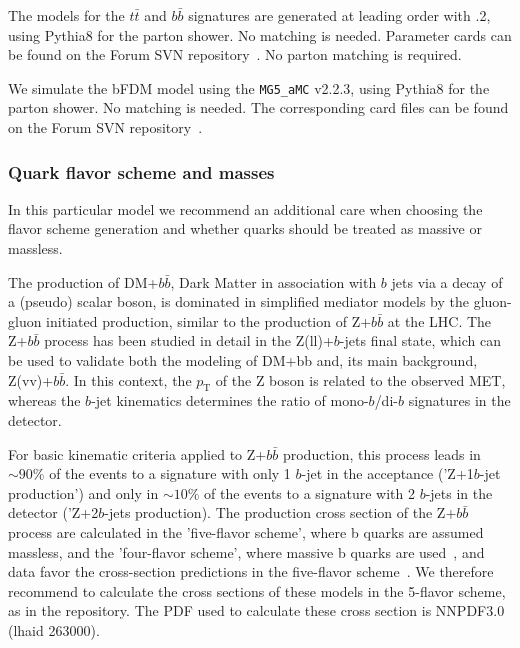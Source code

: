 The models for the $t \bar{t}$ and $b \bar{b}$ signatures are generated at leading
order with .2, using Pythia8 for the parton shower. No matching is needed. 
Parameter cards can be found on the Forum SVN repository~\cite{ForumSVN_DMTTBar}.
No parton matching is required. 

We simulate the bFDM model using the {\tt MG5\_aMC} v2.2.3, using Pythia8 for the parton shower. 
No matching is needed. The corresponding card files can be found 
on the Forum SVN repository~\cite{ForumSVN_DMSingleB}.

\subsubsection{Quark flavor scheme and masses}

In this particular model we recommend an additional care when choosing
the flavor scheme generation and whether quarks should be treated as massive or massless. 

The production of DM+$b\bar{b}$, Dark Matter in association with $b$ jets via a decay of a (pseudo) scalar boson, 
is dominated in simplified mediator models by the gluon-gluon initiated production, similar to the production of 
Z+$b\bar{b}$ at the LHC. The Z+$b\bar{b}$ process has been studied in detail in the Z(ll)+$b$-jets final state, 
which can be used to validate both the modeling of DM+bb and, its main background, Z(vv)+$b\bar{b}$. 
In this context, the $p_\textrm{T}$ of the Z boson is related to the observed MET, whereas the $b$-jet kinematics 
determines the ratio of mono-$b$/di-$b$ signatures in the detector.


For basic kinematic criteria applied to Z+$b\bar{b}$ production, this process leads in $\sim90\%$ of 
the events to a signature with only 1 $b$-jet in the acceptance ('Z+1$b$-jet production') and only in 
$\sim10\%$ of the events to a signature with 2 $b$-jets in the detector ('Z+2$b$-jets production). 
The production cross section of the Z+$b\bar{b}$ process are calculated in the 'five-flavor scheme', 
where b quarks are assumed massless, and the 'four-flavor scheme', where massive b quarks are 
used~\cite{Campbell:2003dd,Maltoni:2005wd,Campbell:2005zv}, 
and data favor the cross-section predictions in the five-flavor scheme~\cite{Chatrchyan:2014dha}.
We therefore recommend to calculate the cross sections of these
models in the 5-flavor scheme, as in the repository. 
The PDF used to calculate these cross section is NNPDF3.0 (lhaid 263000). 

